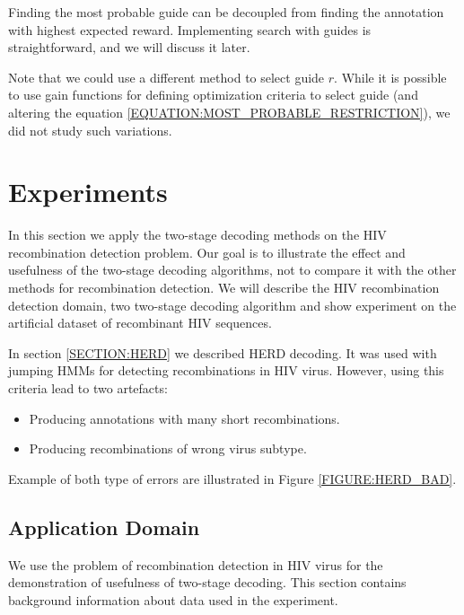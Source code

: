 Finding the most probable guide can be decoupled from finding the
annotation with highest expected reward. Implementing search with guides is straightforward, and we will
discuss it later.

Note that we could use a different method to select guide $r$. While it is
possible to use gain functions for defining optimization criteria to select
guide (and altering the equation \ref{EQUATION:MOST_PROBABLE_RESTRICTION}), 
we did not study such variations.

\section{Experiments}

In this section we apply the two-stage decoding methods on the HIV
recombination detection problem. Our goal is to illustrate the effect and
usefulness of the two-stage decoding algorithms, not to compare it with the
other methods for recombination detection.  We will describe the HIV
recombination detection domain, two two-stage decoding algorithm and show
experiment on the artificial dataset of recombinant HIV sequences.

In section \ref{SECTION:HERD} we described HERD decoding. It was used with
jumping HMMs \cite{Schultz2006} for detecting recombinations in HIV virus.
However, using this criteria lead to two artefacts: 
\begin{itemize}[itemsep=-1mm]
\item Producing annotations with many short recombinations.  
\item Producing recombinations of wrong virus subtype.  
\end{itemize}
Example of both type of
errors are illustrated in Figure \ref{FIGURE:HERD_BAD}.

\subsection{Application Domain}
We use the problem of recombination detection in HIV virus for the demonstration of
usefulness of two-stage decoding.  This section contains background information
about data used in the experiment.

